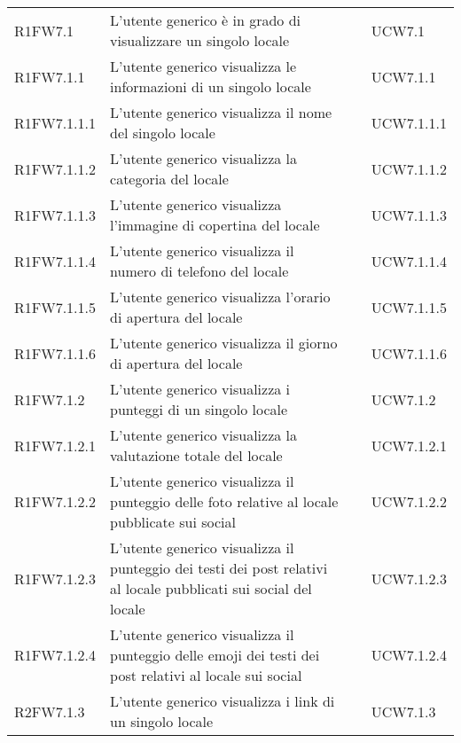 \begin{longtable}{ m{}<{\centering}  m{}<{\centering}  m{}<{\centering}  m{}<{\centering}}
	R1FW7.1 & L'utente generico è in grado di visualizzare un singolo locale & \Ob & UCW7.1 \\

	R1FW7.1.1 & L'utente generico visualizza le informazioni di un singolo locale & \Ob & UCW7.1.1 \\

	R1FW7.1.1.1 & L'utente generico visualizza il nome del singolo locale & \Ob & UCW7.1.1.1 \\	
	
	R1FW7.1.1.2 & L'utente generico visualizza la categoria del locale & \Ob & UCW7.1.1.2 \\	 

	R1FW7.1.1.3 & L'utente generico visualizza l'immagine di copertina del locale & \Ob & UCW7.1.1.3\\	

	R1FW7.1.1.4 &	L'utente generico visualizza il numero di telefono del locale & \Ob & UCW7.1.1.4 \\

	R1FW7.1.1.5 &	L'utente generico visualizza l'orario di apertura del locale & \De & UCW7.1.1.5 \\
	
	R1FW7.1.1.6 &	L'utente generico visualizza il giorno di apertura del locale & \De & UCW7.1.1.6 \\				

	R1FW7.1.2 & L'utente generico visualizza i punteggi di un singolo locale & \Ob & UCW7.1.2 \\

	R1FW7.1.2.1 &	L'utente generico visualizza la valutazione totale del locale & \Ob & UCW7.1.2.1 \\		

	R1FW7.1.2.2 & L'utente generico visualizza il punteggio delle foto relative al locale pubblicate sui social & \Ob & UCW7.1.2.2 \\

	R1FW7.1.2.3 &	L'utente generico visualizza il punteggio dei testi dei post relativi al locale pubblicati sui social del locale & \Ob & UCW7.1.2.3 \\
	
	R1FW7.1.2.4 &	L'utente generico visualizza il punteggio delle emoji dei testi dei post relativi al locale sui social & \Ob & UCW7.1.2.4 \\		

	R2FW7.1.3 & L'utente generico visualizza i link di un singolo locale & \Ob & UCW7.1.3 \\


\end{longtable}
